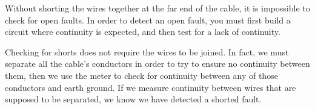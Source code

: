 Without shorting the wires together at the far end of the cable, it is impossible to check for open faults.  In order to detect an open fault, you must first build a circuit where continuity is expected, and then test for a lack of continuity.  

\vskip 10pt

Checking for shorts does not require the wires to be joined.  In fact, we must separate all the cable's conductors in order to try to ensure no continuity between them, then we use the meter to check for continuity between any of those conductors and earth ground.  If we measure continuity between wires that are supposed to be separated, we know we have detected a shorted fault.




